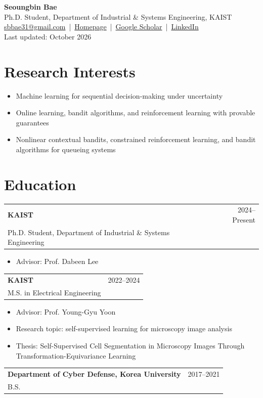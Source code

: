 \documentclass[10pt]{article}
\makeatletter
\newcommand{\entry}[4]{
  \begin{tabular*}{\textwidth}{@{\extracolsep{\fill}} l r}
    \textbf{#1} & #2 \\
    #3 & #4
  \end{tabular*}
}
\makeatother
\begin{document}
\begin{center}
  {\LARGE \textbf{Seoungbin Bae}}\\[0.12em]
  Ph.D. Student, Department of Industrial \& Systems Engineering, KAIST\\
  \href{mailto:sbbae31@gmail.com}{sbbae31@gmail.com} \,|\, \href{https://sbbae31.github.io/}{Homepage} \,|\, \href{https://scholar.google.com/citations?user=eyeMFY4AAAAJ\&hl=en}{Google Scholar} \,|\, \href{https://www.linkedin.com/in/seoungbin-bae-537336328}{LinkedIn}\\
  Last updated: October 2026
\end{center}

\section*{Research Interests}
\begin{itemize}
  \item Machine learning for sequential decision-making under uncertainty
  \item Online learning, bandit algorithms, and reinforcement learning with provable guarantees
  \item Nonlinear contextual bandits, constrained reinforcement learning, and bandit algorithms for queueing systems
\end{itemize}

\section*{Education}
\entry{KAIST}{2024--Present}{Ph.D. Student, Department of Industrial \& Systems Engineering}{}
\begin{itemize}
  \item Advisor: Prof. Dabeen Lee
\end{itemize}

\entry{KAIST}{2022--2024}{M.S. in Electrical Engineering}{}
\begin{itemize}
  \item Advisor: Prof. Young-Gyu Yoon
  \item Research topic: self-supervised learning for microscopy image analysis
  \item Thesis: Self-Supervised Cell Segmentation in Microscopy Images Through Transformation-Equivariance Learning
\end{itemize}

\entry{Department of Cyber Defense, Korea University}{2017--2021}{B.S.}{}
\end{document}
